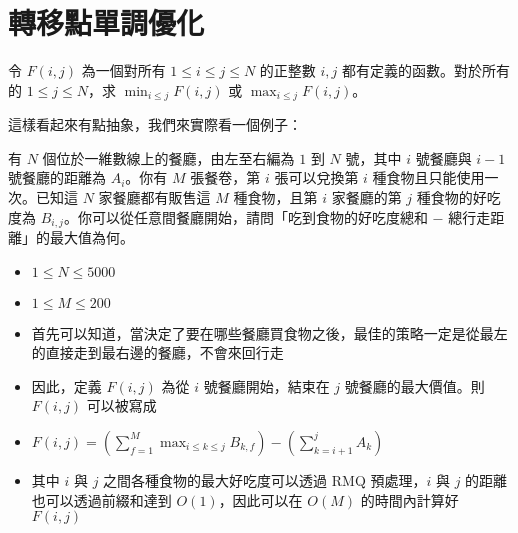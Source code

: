 \documentclass[standalone]{beamer}
\begin{document}
\section{轉移點單調優化}

\begin{frame}{}
  \begin{problem}[經典問題]
    令 $F(i, j)$ 為一個對所有 $1 \leq i \leq j \leq N$ 的正整數 $i, j$ 都有定義的函數。對於所有的 $1 \leq j \leq N$，求 $\min_{i \leq j}F(i, j)$ 或 $\max_{i \leq j}F(i, j)$。
  \end{problem}
  這樣看起來有點抽象，我們來實際看一個例子：
\end{frame}

\begin{frame}{}
  \begin{problem}
    有 $N$ 個位於一維數線上的餐廳，由左至右編為 $1$ 到 $N$ 號，其中 $i$ 號餐廳與 $i - 1$ 號餐廳的距離為 $A_i$。你有 $M$ 張餐卷，第 $i$ 張可以兌換第 $i$ 種食物且只能使用一次。已知這 $N$ 家餐廳都有販售這 $M$ 種食物，且第 $i$ 家餐廳的第 $j$ 種食物的好吃度為 $B_{i, j}$。你可以從任意間餐廳開始，請問「吃到食物的好吃度總和 $-$ 總行走距離」的最大值為何。
    
    \begin{itemize}
      \item $1 \leq N \leq 5000$
      \item $1 \leq M \leq 200$
    \end{itemize}
  \end{problem}
\end{frame}

\begin{frame}{}
  \begin{itemize}
    \item 首先可以知道，當決定了要在哪些餐廳買食物之後，最佳的策略一定是從最左的直接走到最右邊的餐廳，不會來回行走
    \item 因此，定義 $F(i, j)$ 為從 $i$ 號餐廳開始，結束在 $j$ 號餐廳的最大價值。則 $F(i, j)$ 可以被寫成
    \item $F(i, j) = \left(\sum_{f = 1}^{M}\max_{i \leq k \leq j}B_{k, f}\right) - \left(\sum_{k = i + 1}^{j}A_k\right)$
    \item 其中 $i$ 與 $j$ 之間各種食物的最大好吃度可以透過 RMQ 預處理，$i$ 與 $j$ 的距離也可以透過前綴和達到 $O(1)$，因此可以在 $O(M)$ 的時間內計算好 $F(i, j)$
  \end{itemize}
\end{frame}
\end{document}
